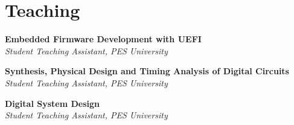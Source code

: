 \section{\sc Teaching}

{\bf{Embedded Firmware Development with UEFI}} \\
\textit{Student Teaching Assistant, PES University}

{\bf{Synthesis, Physical Design and Timing Analysis of Digital Circuits}} \\
\textit{Student Teaching Assistant, PES University}

{\bf{Digital System Design}} \\
\textit{Student Teaching Assistant, PES University}

\endinput
